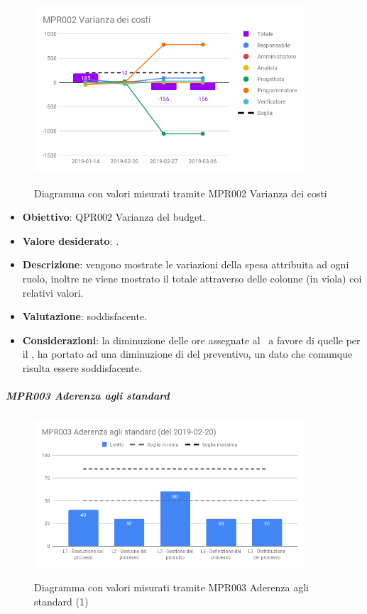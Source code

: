 	\begin{figure}[H]
		\centering
		\includegraphics[width=0.9\textwidth]{img/cruscotti/RP/MPR002.png}
		\label{immagineVarianzaCostiRP}
		\caption{Diagramma con valori misurati tramite MPR002 Varianza dei costi}
	\end{figure}

	\begin{itemize}
		\item \textbf{Obiettivo}: QPR002 Varianza del budget.
		\item \textbf{Valore desiderato}: .
		\item \textbf{Descrizione}: vengono mostrate le variazioni della spesa attribuita ad ogni ruolo, inoltre ne viene mostrato il totale attraverso delle colonne (in viola) coi relativi valori.
		\item \textbf{Valutazione}: soddisfacente.
		\item \textbf{Considerazioni}: la diminuzione delle ore assegnate al \Prog\ a favore di quelle per il \Progr, ha portato ad una diminuzione di  del preventivo, un dato che comunque risulta essere soddisfacente.
	\end{itemize}


	\subparagraph{MPR003 Aderenza agli standard}

	\begin{figure}[H]
		\centering
		\includegraphics[width=0.9\textwidth]{img/cruscotti/RP/MPR003(1).png}
		\label{immagineAderenzaStandard1RP}
		\caption{Diagramma con valori misurati tramite MPR003 Aderenza agli standard (1)}
	\end{figure}

